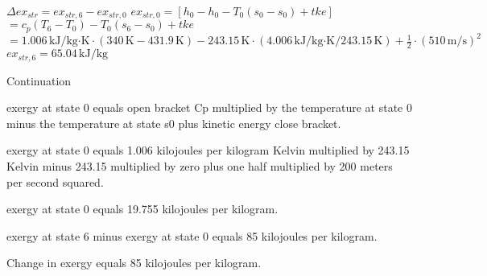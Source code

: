 \( \Delta ex_{str} = ex_{str,6} - ex_{str,0} \)  
\( ex_{str,0} = [h_0 - h_0 - T_0(s_0 - s_0) + tke] \)  
\( = c_p(T_6 - T_0) - T_0(s_6 - s_0) + tke \)  
\( = 1.006 \, \text{kJ/kg·K} \cdot (340 \, \text{K} - 431.9 \, \text{K}) - 243.15 \, \text{K} \cdot (4.006 \, \text{kJ/kg·K} / 243.15 \, \text{K}) + \frac{1}{2} \cdot (510 \, \text{m/s})^2 \)  
\( ex_{str,6} = 65.04 \, \text{kJ/kg} \)

Continuation  

exergy at state 0 equals open bracket Cp multiplied by the temperature at state 0 minus the temperature at state s0 plus kinetic energy close bracket.  

exergy at state 0 equals 1.006 kilojoules per kilogram Kelvin multiplied by 243.15 Kelvin minus 243.15 multiplied by zero plus one half multiplied by 200 meters per second squared.  

exergy at state 0 equals 19.755 kilojoules per kilogram.  

exergy at state 6 minus exergy at state 0 equals 85 kilojoules per kilogram.  

Change in exergy equals 85 kilojoules per kilogram.